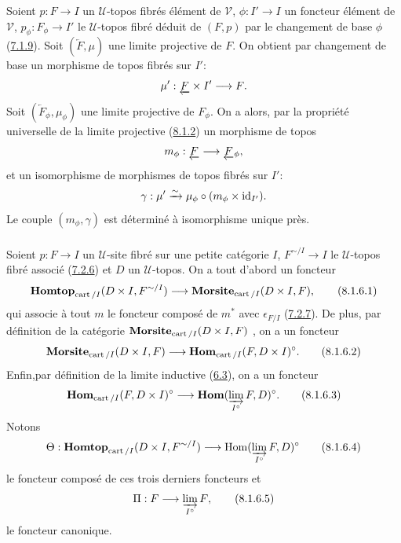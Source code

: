 \documentclass[10pt]{../fichiers-configuration-latex/smfart}
\begin{document}
\subsubsection{}

Soient $p : F \to I$ un $𝒰$-topos fibrés élément de
$𝒱$, $\phi : I'\to I$ un foncteur élément de $𝒱$, $p_{\phi} : F_{\phi} \to I'$ le
$𝒰$-topos fibré déduit de $(F, p)$ par le changement de base $\phi$
(\hyperref[VI.subsubsec7.1.9]{7.1.9}). Soit $(\underleftarrow{F}, \mu)$ une limite projective de $F$. On
obtient par changement de base un morphisme de topos fibrés sur $I'$:
$$
\mu' : \underleftarrow{F} \times I' \to F{\quoi}.
$$
Soit $(\underleftarrow{F}_{\phi}, \mu_{\phi})$ une limite projective de
$F_{\phi}$. On a alors, par la propriété universelle de la limite
projective (\hyperref[VI.subsubsec8.1.2]{8.1.2}) un morphisme de topos
$$
m_{\phi} : \underleftarrow{F} \to \underleftarrow{F}_{\phi}{\quoi},
$$
et un isomorphisme de morphismes de topos fibrés sur $I'$:
$$
\gamma : \mu'\xrightarrow{\sim} \mu_{\phi} \circ (m_{\phi} \times \operatorname{id}_{I'}){}.
$$
Le couple $(m_{\phi}, \gamma)$ est déterminé à isomorphisme unique
près.

\subsubsection{}

Soient $p : F \to I$ un $𝒰$-site fibré sur une petite catégorie $I$,
$F^{\sim/I} \to I$ le $𝒰$-topos fibré associé (\hyperref[VI.subsubsec7.2.6]{7.2.6}) et $D$ un
$𝒰$-topos. On a tout d'abord un foncteur
\begin{equation*}
\Hhomtop_{\cart / I} (D \times I, F^{\sim/I}) \to
\Mmorsite_{\cart/I}(D \times I, F){\quoi},\tag{8.1.6.1}
\end{equation*}
qui associe à tout $m$ le foncteur composé de $m^{\ast}$ avec
$\epsilon_{F /I}$ (\hyperref[VI.prop7.2.7]{7.2.7}). De plus, par définition de la catégorie
$\operatorname{\mathbf{Morsite}}_{\operatorname{cart} /I} (D \times I, F)$ , on a un foncteur
\begin{equation*}
\Mmorsite_{\cart/I}(D \times I, F) \to \Hhom_{\cart / I} (F, D \times
I)^{\circ}{\quoi}.\tag{8.1.6.2}
\end{equation*}
Enfin,\pageoriginale par définition de la limite inductive (\hyperref[VI.def6.3]{6.3}), on a
un foncteur
\begin{equation*}
\Hhom_{\cart / I} (F, D \times I)^{\circ} \to
\Hhom(\varinjlim_{I^{\circ}}F, D)^{\circ}{\quoi}.\tag{8.1.6.3}
\end{equation*}
Notons
\begin{equation*}
\Theta : \Hhomtop_{\cart / I}(D \times I, F^{\sim / I}) \to
\Hom(\varinjlim_{I^{\circ}}F, D)^{\circ}\tag{8.1.6.4}
\end{equation*}
le foncteur composé de ces trois derniers foncteurs et
\begin{equation*}
\Pi : F \to \varinjlim_{I^{\circ}}F{\quoi},\tag{8.1.6.5}
\end{equation*}
le foncteur canonique.
\end{document}
